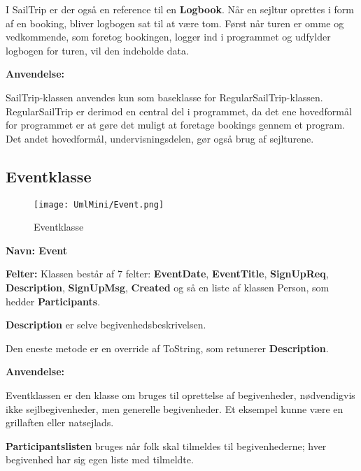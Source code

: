 I SailTrip er der også en reference til en \textbf{Logbook}.
Når en sejltur oprettes i form af en booking, bliver logbogen sat til at være tom.
Først når turen er omme og vedkommende, som foretog bookingen, logger ind i programmet og udfylder logbogen for turen, vil den indeholde data.

\textbf{Anvendelse:}

SailTrip-klassen anvendes kun som baseklasse for RegularSailTrip-klassen. 
RegularSailTrip er derimod en central del i programmet, da det ene hovedformål for programmet er at gøre det muligt at foretage bookings gennem et program. Det andet hovedformål, undervisningsdelen, gør også brug af sejlturene. 

\subsection{Eventklasse}

\begin{wrapfigure}[10]{R}{0.5\textwidth}
    \label{img:login_interface}
    \vspace{-20pt}
    \begin{center}
        \texttt{[image: UmlMini/Event.png]}
    \end{center}
    \vspace{-20pt}
    \caption{Eventklasse}
\end{wrapfigure}

\textbf{Navn: Event}

\textbf{Felter:}
Klassen består af 7 felter: \textbf{EventDate}, \textbf{EventTitle}, \textbf{SignUpReq}, \textbf{Description}, \textbf{SignUpMsg}, \textbf{Created} og så en liste af klassen Person, som hedder \textbf{Participants}.

\textbf{Description} er selve begivenhedsbeskrivelsen. 

Den eneste metode er en override af ToString, som retunerer \textbf{Description}.

\textbf{Anvendelse:}

Eventklassen er den klasse om bruges til oprettelse af  begivenheder, nødvendigvis ikke sejlbegivenheder, men generelle begivenheder. Et eksempel kunne være en grillaften eller natsejlads.

\textbf{Participantslisten} bruges når folk skal tilmeldes til begivenhederne; hver begivenhed har sig egen liste med tilmeldte. 

